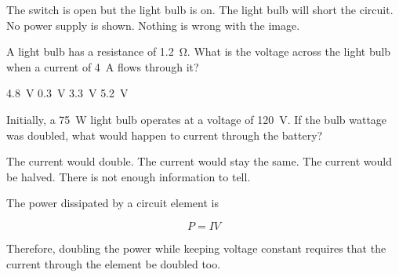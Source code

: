 \documentclass[answers]{exam}
\begin{document}
\begin{questions}
\begin{center}
\end{center}

\begin{randomizechoices}[keeplast]
    \correctchoice The switch is open but the light bulb is on.
    \choice  The light bulb will short the circuit.
    \choice No power supply is shown.
    \choice Nothing is wrong with the image.
\end{randomizechoices}

\question
A light bulb has a resistance of \SI{1.2}{\ohm}. What is the voltage across the light bulb when a current of \SI{4}{A} flows through it?

\begin{randomizeoneparchoices}
    \correctchoice \SI{4.8}{V}
    \choice \SI{0.3}{V}
    \choice \SI{3.3}{V}
    \choice \SI{5.2}{V}
\end{randomizeoneparchoices}

\clearpage

\question
Initially, a \SI{75}{W} light bulb operates at a voltage of \SI{120}{V}. If the bulb wattage was doubled, what would happen to current through the battery?

\begin{randomizechoices}[keeplast]
    \correctchoice The current would double.
    \choice The current would stay the same.
    \choice The current would be halved.
    \choice There is not enough information to tell.
\end{randomizechoices}

\begin{solution}
The power dissipated by a circuit element is

\begin{equation*}
    P=IV
\end{equation*}

Therefore, doubling the power while keeping voltage constant requires that the current through the element be doubled too.
\end{solution}


\end{questions}
\end{document}

